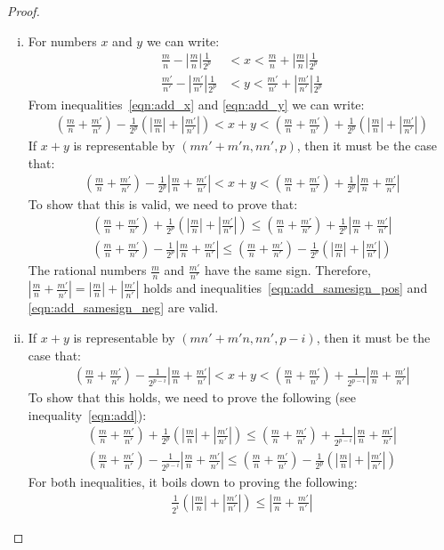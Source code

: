 \documentclass{article}
\numberwithin{mytheorem}{section}
\begin{document}
\begin{proof}
\textit{\\}
\begin{enumerate}[i.]
\item
For numbers $x$ and $y$ we can write:
\begin{align}
\frac{m}{n}-|\frac{m}{n}|\frac{1}{2^{p}}&<x<\frac{m}{n}+|\frac{m}{n}|\frac{1}{2^{p}} \label{eqn:add_x}\\
\frac{m'}{n'}-|\frac{m'}{n'}|\frac{1}{2^{p}}&<y<\frac{m'}{n'}+|\frac{m'}{n'}|\frac{1}{2^{p}} \label{eqn:add_y}
\end{align}
From inequalities~\eqref{eqn:add_x} and \eqref{eqn:add_y} we can write:
\begin{align}
(\frac{m}{n}+\frac{m'}{n'})-\frac{1}{2^{p}}(|\frac{m}{n}|+|\frac{m'}{n'}|)<x+y<(\frac{m}{n}+\frac{m'}{n'})+\frac{1}{2^{p}}(|\frac{m}{n}|+|\frac{m'}{n'}|)\label{eqn:add}
\end{align}
If $x+y$ is representable by $(mn'+m'n,nn',p)$, then it must be the case that:
\begin{align*}
(\frac{m}{n}+\frac{m'}{n'})-\frac{1}{2^{p}}|\frac{m}{n}+\frac{m'}{n'}|<x+y<(\frac{m}{n}+\frac{m'}{n'})+\frac{1}{2^{p}}|\frac{m}{n}+\frac{m'}{n'}|
\end{align*}
To show that this is valid, we need to prove that:
\begin{align}
(\frac{m}{n}+\frac{m'}{n'})+\frac{1}{2^{p}}(|\frac{m}{n}|+|\frac{m'}{n'}|)\leq (\frac{m}{n}+\frac{m'}{n'})+\frac{1}{2^{p}}|\frac{m}{n}+\frac{m'}{n'}| \label{eqn:add_samesign_pos} \\
(\frac{m}{n}+\frac{m'}{n'})-\frac{1}{2^{p}}|\frac{m}{n}+\frac{m'}{n'}| \leq (\frac{m}{n}+\frac{m'}{n'})-\frac{1}{2^{p}}(|\frac{m}{n}|+|\frac{m'}{n'}|) \label{eqn:add_samesign_neg}
\end{align} 
The rational numbers $\frac{m}{n}$ and $\frac{m'}{n'}$ have the same sign. Therefore, $|\frac{m}{n}+\frac{m'}{n'}|=|\frac{m}{n}|+|\frac{m'}{n'}|$ holds and inequalities~\eqref{eqn:add_samesign_pos} and \eqref{eqn:add_samesign_neg} are valid. 
\item
If $x+y$ is representable by $(mn'+m'n,nn',p-i)$, then it must be the case that:
\begin{align*}
(\frac{m}{n}+\frac{m'}{n'})-\frac{1}{2^{p-i}}|\frac{m}{n}+\frac{m'}{n'}|<x+y<(\frac{m}{n}+\frac{m'}{n'})+\frac{1}{2^{p-i}}|\frac{m}{n}+\frac{m'}{n'}|
\end{align*}
To show that this holds, we need to prove the following (see inequality~\eqref{eqn:add}):
\begin{align*}
(\frac{m}{n}+\frac{m'}{n'})+\frac{1}{2^{p}}(|\frac{m}{n}|+|\frac{m'}{n'}|)\leq (\frac{m}{n}+\frac{m'}{n'})+\frac{1}{2^{p-i}}|\frac{m}{n}+\frac{m'}{n'}|\\
(\frac{m}{n}+\frac{m'}{n'})-\frac{1}{2^{p-i}}|\frac{m}{n}+\frac{m'}{n'}|\leq (\frac{m}{n}+\frac{m'}{n'})-\frac{1}{2^{p}}(|\frac{m}{n}|+|\frac{m'}{n'}|)
\end{align*}
For both inequalities, it boils down to proving the following:
\begin{align}
\frac{1}{2^i}(|\frac{m}{n}|+|\frac{m'}{n'}|)\leq |\frac{m}{n}+\frac{m'}{n'}|\label{eqn:add_diff_sgn}
\end{align}



\end{enumerate}
\end{proof}
\end{document}
